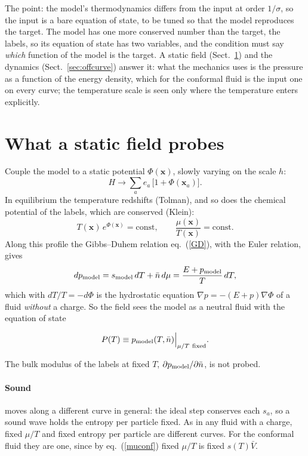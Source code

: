 \documentclass[11pt,aps,preprint,nofootinbib,superscriptaddress,tightenlines]{revtex4-2}
\def\st{\begin{equation}}
\def\stp{\end{equation}}
\def\Eq#1{eq.~(\ref{#1})}
\def\Sect#1{Sect.~\ref{#1}}
\let\oldparagraph\paragraph
\renewcommand{\paragraph}{\par\bigskip\oldparagraph}
\begin{document}

The point: the model's thermodynamics differs from the input at order $1/\sigma$, so the input is a bare equation of state, to be tuned so that the model
reproduces the target.  The model has one more conserved number than the target, the labels, so its equation of state has two variables, and the condition
must say \emph{which} function of the model is the target.  A static field (\Sect{sec:gravity}) and the dynamics (\Sect{sec:offcurve}) answer it: what the
mechanics uses is the pressure as a function of the energy density, which for the conformal fluid is the input one on every curve; the temperature scale is seen
only where the temperature enters explicitly.

\section{What a static field probes}
\label{sec:gravity}

Couple the model to a static potential $\Phi(\bm x)$, slowly varying on the scale $h$:
\st
H\to\sum_ae_a\,\big[1+\Phi(\bm x_a)\big] .
\stp
In equilibrium the temperature redshifts (Tolman), and so does the chemical potential of the labels, which are conserved (Klein):
\st
T(\bm x)\,e^{\Phi(\bm x)}=\text{const},\qquad \frac{\mu(\bm x)}{T(\bm x)}=\text{const} .
\stp
Along this profile the Gibbs--Duhem relation \Eq{GD}, with the Euler relation, gives
\st
dp_{\rm model}=s_{\rm model}\,dT+\bar n\,d\mu=\frac{E+p_{\rm model}}T\,dT ,
\stp
which with $dT/T=-d\Phi$ is the hydrostatic equation $\nabla p=-(E+p)\nabla\Phi$ of a fluid \emph{without} a charge.  So the field sees the model as a
neutral fluid with the equation of state
\begin{keyeq}
\st
P(T)\equiv p_{\rm model}(T,\bar n)\Big|_{\mu/T\ \text{fixed}} .
\label{Pren}
\stp
\end{keyeq}
The bulk modulus of the labels at fixed $T$, $\partial p_{\rm model}/\partial\bar n$, is not probed.

\paragraph{Sound} moves along a different curve in general: the ideal step conserves each $s_a$, so a sound wave holds the entropy per particle fixed.
As in any fluid with a charge, fixed $\mu/T$ and fixed entropy per particle are different curves.  For the conformal fluid they are one, since by
\Eq{muconf} fixed $\mu/T$ is fixed $s(T)\bar V$.
\end{document}
